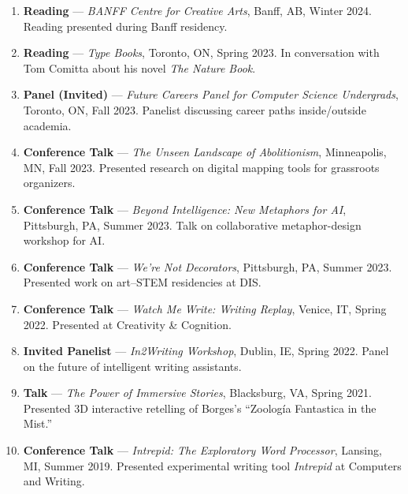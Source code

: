 \begin{enumerate}
\item \textbf{Reading} --- \emph{BANFF Centre for Creative Arts}, Banff, AB, Winter 2024.
\subitem Reading presented during Banff residency.

\item \textbf{Reading} --- \emph{Type Books}, Toronto, ON, Spring 2023.
\subitem In conversation with Tom Comitta about his novel \emph{The Nature Book}.

\item \textbf{Panel (Invited)} --- \emph{Future Careers Panel for Computer Science Undergrads}, Toronto, ON, Fall 2023.
\subitem Panelist discussing career paths inside/outside academia.

\item \textbf{Conference Talk} --- \emph{The Unseen Landscape of Abolitionism}, Minneapolis, MN, Fall 2023.
\subitem Presented research on digital mapping tools for grassroots organizers.

\item \textbf{Conference Talk} --- \emph{Beyond Intelligence: New Metaphors for AI}, Pittsburgh, PA, Summer 2023.
\subitem Talk on collaborative metaphor-design workshop for AI.

\item \textbf{Conference Talk} --- \emph{We're Not Decorators}, Pittsburgh, PA, Summer 2023.
\subitem Presented work on art--STEM residencies at DIS.

\item \textbf{Conference Talk} --- \emph{Watch Me Write: Writing Replay}, Venice, IT, Spring 2022.
\subitem Presented at Creativity \& Cognition.

\item \textbf{Invited Panelist} --- \emph{In2Writing Workshop}, Dublin, IE, Spring 2022.
\subitem Panel on the future of intelligent writing assistants.

\item \textbf{Talk} --- \emph{The Power of Immersive Stories}, Blacksburg, VA, Spring 2021.
\subitem Presented 3D interactive retelling of Borges's ``Zoolog\'ia Fantastica in the Mist.''

\item \textbf{Conference Talk} --- \emph{Intrepid: The Exploratory Word Processor}, Lansing, MI, Summer 2019.
\subitem Presented experimental writing tool \emph{Intrepid} at Computers and Writing.


\end{enumerate}

